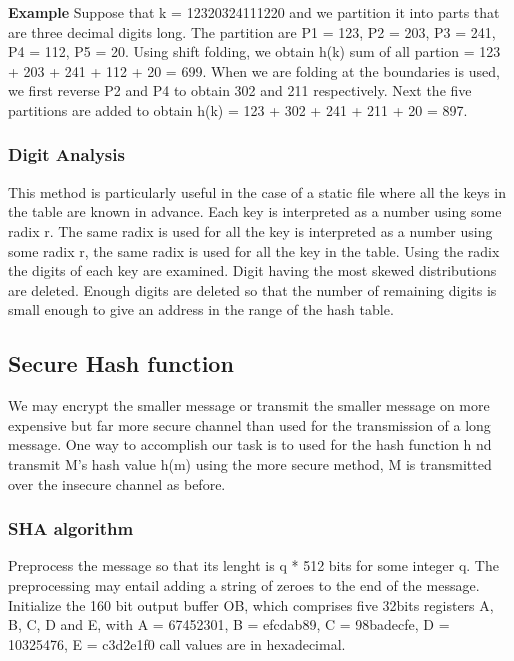 \textbf{Example} Suppose that k = 12320324111220 and we partition it
into parts that are three decimal digits long. The partition are P1 =
123, P2 = 203, P3 = 241, P4 = 112, P5 = 20. Using shift folding, we
obtain h(k) sum of all partion = 123 + 203 + 241 + 112 + 20 = 699. When
we are folding at the boundaries is used, we first reverse P2 and P4 to
obtain 302 and 211 respectively. Next the five partitions are added to
obtain h(k) = 123 + 302 + 241 + 211 + 20 = 897.

\subsubsection{Digit Analysis}\label{digit-analysis}

This method is particularly useful in the case of a static file where
all the keys in the table are known in advance. Each key is interpreted
as a number using some radix r. The same radix is used for all the key
is interpreted as a number using some radix r, the same radix is used
for all the key in the table. Using the radix the digits of each key are
examined. Digit having the most skewed distributions are deleted. Enough
digits are deleted so that the number of remaining digits is small
enough to give an address in the range of the hash table.

\subsection{Secure Hash function}\label{secure-hash-function}

We may encrypt the smaller message or transmit the smaller message on
more expensive but far more secure channel than used for the
transmission of a long message. One way to accomplish our task is to
used for the hash function h nd transmit M's hash value h(m) using the
more secure method, M is transmitted over the insecure channel as
before.

\subsubsection{SHA algorithm}\label{sha-algorithm}

Preprocess the message so that its lenght is q * 512 bits for some
integer q. The preprocessing may entail adding a string of zeroes to the
end of the message. Initialize the 160 bit output buffer OB, which
comprises five 32bits registers A, B, C, D and E, with A = 67452301, B =
efcdab89, C = 98badecfe, D = 10325476, E = c3d2e1f0 call values are in
hexadecimal.

